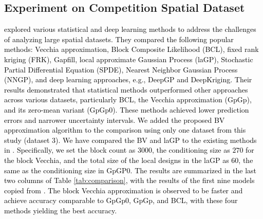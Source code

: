 \documentclass[12pt]{article}
\begin{document}
\newpage
\subsection{Experiment on Competition Spatial Dataset}
\label{spp:experiments}

\textcolor{black}{\citet{hazra2024exploring} explored various statistical and deep learning methods to address the challenges of analyzing large spatial datasets. They compared the following popular methods: Vecchia approximation, Block Composite Likelihood (BCL), fixed rank kriging (FRK), Gapfill, local approximate Gaussian Process (laGP), Stochastic Partial Differential Equation (SPDE), Nearest Neighbor Gaussian Process (NNGP), and deep learning approaches, e.g., DeepGP and DeepKriging. Their results demonstrated that statistical methods outperformed other approaches across various datasets, particularly BCL, the Vecchia approximation (GpGp), and its zero-mean variant (GpGp0). These methods achieved lower prediction errors and narrower uncertainty intervals. 
We added the proposed BV approximation algorithm to the comparison using only one dataset from this study (dataset 3). We have compared the BV and laGP to the existing methods in \cite{hazra2024exploring}. Specifically, we set the block count as $3000$, the conditioning size as $270$ for the block Vecchia, and the total size of the local designs in the laGP as $60$, the same as the conditioning size in GpGP0. The results are summarized in the last two columns of Table \ref{tab:comparison}, with the results of the first nine models copied from \cite{hazra2024exploring}. The block Vecchia approximation is observed to be faster and achieve accuracy comparable to GpGp0, GpGp, and BCL, with these four methods yielding the best accuracy.  
}
\end{document}
